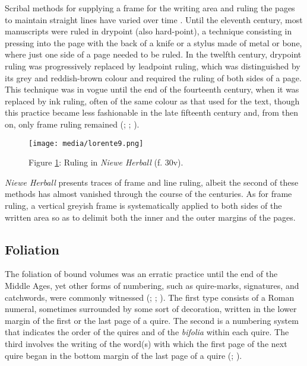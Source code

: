 \documentclass{article}
\begin{document}
Scribal methods for supplying a frame for the writing area and ruling
the pages to maintain straight lines have varied over time \mancite\citep[6]{petti_english_1977}. Until the eleventh century, most manuscripts were ruled in drypoint
(also hard-point), a technique consisting in pressing into the page with
the back of a knife or a stylus made of metal or bone, where just one
side of a page needed to be ruled. In the twelfth century, drypoint
ruling was progressively replaced by leadpoint ruling, which was
distinguished by its grey and reddish-brown colour and required the
ruling of both sides of a page. This technique was in vogue until the
end of the fourteenth century, when it was replaced by ink ruling, often
of the same colour as that used for the text, though this practice
became less fashionable in the late fifteenth century and, from then on,
only frame ruling remained (\cite[23]{de_hamel_scribes_1992}; \cite[16--17]{clemens_introduction_2007}; \cite{calle-martin_exploring_nodate}).
\begin{figure}
    \centering
    \texttt{[image: media/lorente9.png]}
    \caption{Figure \ref{fig:lorente9}: Ruling in \emph{Niewe Herball} (f. 30v).}
    \label{fig:lorente9}
\end{figure}
\emph{Niewe Herball} presents traces of frame and line ruling, albeit
the second of these methods has almost vanished through the course of
the centuries. As for frame ruling, a vertical greyish
frame is systematically applied to both sides of the written area so as
to delimit both the inner and the outer margins of the pages.

\subsection{Foliation}\label{sec:foliation}

The foliation of bound volumes was an erratic practice until the end of
the Middle Ages, yet other forms of numbering, such as quire-marks,
signatures, and catchwords, were commonly witnessed (\cite[6]{petti_english_1977};
\cite[33--34]{derolez_palaeography_2003}; \cite[5]{romero-barranco_late_2015}). The first type consists
of a Roman numeral, sometimes surrounded by some sort of decoration,
written in the lower margin of the first or the last page of a quire.
The second is a numbering system that indicates the order of
the quires and of the \emph{bifolia} within each quire. The third
involves the writing of the word(s) with which the first page of the next quire began in the bottom margin of the last page of a quire
 (\cite[33--34]{derolez_palaeography_2003}; \cite[49]{clemens_introduction_2007}).
\end{document}
